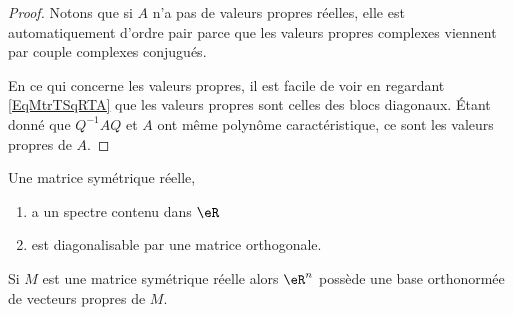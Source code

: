 \begin{proof}
	Notons que si \( A\) n'a pas de valeurs propres réelles, elle est automatiquement d'ordre pair parce que les valeurs propres complexes viennent par couple complexes conjugués.

	En ce qui concerne les valeurs propres, il est facile de voir en regardant \eqref{EqMtrTSqRTA} que les valeurs propres sont celles des blocs diagonaux. Étant donné que \( Q^{-1}AQ\) et \( A\) ont même polynôme caractéristique, ce sont les valeurs propres de \( A\).
\end{proof}

\begin{theorem} \label{ThoeTMXla}
	Une matrice symétrique réelle,
	\begin{enumerate}
		\item       \label{ITEMooJWHLooSfhNSW}
		      a un spectre contenu dans \( \eR\)
		\item       \label{ITEMooMWWRooXxGONW}
		      est diagonalisable par une matrice orthogonale.
	\end{enumerate}
	Si \( M\) est une matrice symétrique réelle alors \( \eR^n\) possède une base orthonormée de vecteurs propres de \( M\).
\end{theorem}

